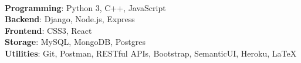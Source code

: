 \\
\textbf{Programming}: Python 3, C++, JavaScript \\
\vspace{1mm}
\textbf{Backend}: Django, Node.js, Express\\
\vspace{1mm}
\textbf{Frontend}: CSS3, React\\
\vspace{1mm}
\textbf{Storage}:  MySQL, MongoDB, Postgres\\
\vspace{1mm}
\textbf{Utilities}:  Git, Postman, RESTful APIs, Bootstrap, SemanticUI, Heroku, {\LaTeX}

